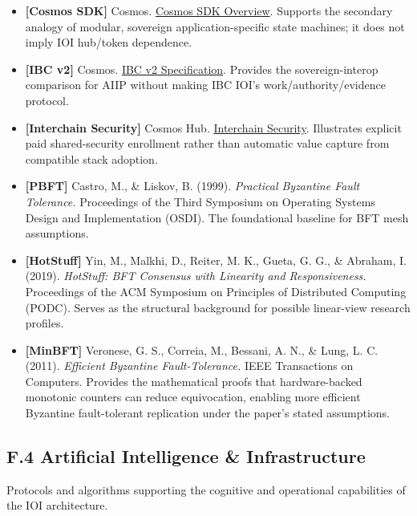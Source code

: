 \documentclass[
  11pt,
]{article}
\providecommand{\tightlist}{%
  \setlength{\itemsep}{0pt}\setlength{\parskip}{0pt}}
\begin{document}
\begin{itemize}
\tightlist
\item
  \textbf{{[}Cosmos SDK{]}} Cosmos. \href{https://docs.cosmos.network/sdk/latest/learn/intro/overview}{Cosmos SDK Overview}.
  Supports the secondary analogy of modular, sovereign application-specific
  state machines; it does not imply IOI hub/token dependence.
\item
  \textbf{{[}IBC v2{]}} Cosmos. \href{https://docs.cosmos.network/ibc/latest/spec/IBC_V2/README}{IBC v2 Specification}.
  Provides the sovereign-interop comparison for AIIP without making IBC IOI's
  work/authority/evidence protocol.
\item
  \textbf{{[}Interchain Security{]}} Cosmos Hub.
  \href{https://docs.cosmos.network/hub/latest/interchain-security/README}{Interchain Security}.
  Illustrates explicit paid shared-security enrollment rather than automatic
  value capture from compatible stack adoption.
\item
  \textbf{{[}PBFT{]}} Castro, M., \& Liskov, B. (1999). \emph{Practical
  Byzantine Fault Tolerance. }Proceedings of the Third Symposium on
  Operating Systems Design and Implementation (OSDI). The foundational
  baseline for BFT mesh assumptions.
\item
  \textbf{{[}HotStuff{]}} Yin, M., Malkhi, D., Reiter, M. K., Gueta, G.
  G., \& Abraham, I. (2019). \emph{HotStuff: BFT Consensus with
  Linearity and Responsiveness.} Proceedings of the ACM Symposium on
  Principles of Distributed Computing (PODC). Serves as the structural
  background for possible linear-view research profiles.
\item
  \textbf{{[}MinBFT{]}} Veronese, G. S., Correia, M., Bessani, A. N., \&
  Lung, L. C. (2011). \emph{Efficient Byzantine Fault-Tolerance.} IEEE
  Transactions on Computers. Provides the mathematical proofs that
  hardware-backed monotonic counters can reduce equivocation, enabling
  more efficient Byzantine fault-tolerant replication under the paper's
  stated assumptions.
\end{itemize}

\hypertarget{f.4-artificial-intelligence-infrastructure}{%
\subsection{F.4 Artificial Intelligence \&
Infrastructure}\label{f.4-artificial-intelligence-infrastructure}}

Protocols and algorithms supporting the cognitive and operational
capabilities of the IOI architecture.
\end{document}

